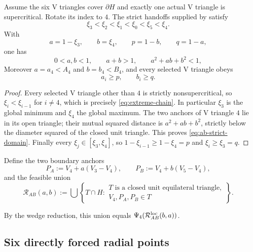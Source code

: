 \begin{lemma}
\label{lem:ab-extreme-jump}
Assume the six V triangles cover $\partial H$ and exactly one actual V triangle is
supercritical.  Rotate its index to $4$.  The strict handoffs supplied by
 satisfy
\begin{equation}
 \xi_3<\xi_2<\xi_1<\xi_0<\xi_5<\xi_4.
 \label{eq:extreme-chain}
\end{equation}
With
\begin{equation}
 a=1-\xi_3,\qquad b=\xi_4,\qquad p=1-b,\qquad q=1-a,
 \label{eq:reader-ab-parameters}
\end{equation}
one has
\begin{equation}
 0<a,b<1,\qquad a+b>1,\qquad a^2+ab+b^2<1,       \label{eq:ab-strict-domain}
\end{equation}
Moreover $a=a_4<A_4$ and $b=b_4<B_4$, and every selected V triangle obeys
\[
 a_i\ge p,\qquad b_i\ge q.
\]
\end{lemma}

\begin{proof}
Every selected V triangle other than $4$ is strictly nonsupercritical, so
$\xi_i<\xi_{i-1}$ for $i\ne4$, which is precisely
\eqref{eq:extreme-chain}.  In particular $\xi_3$ is the global minimum and
$\xi_4$ the global maximum.  The two anchors of V triangle $4$ lie in its open triangle;
their mutual squared distance is $a^2+ab+b^2$, strictly below the diameter
squared of the closed unit triangle.  This proves \eqref{eq:ab-strict-domain}.
Finally every $\xi_j\in[\xi_3,\xi_4]$, so
$1-\xi_{i-1}\ge1-\xi_4=p$ and $\xi_i\ge \xi_3=q$.
\end{proof}

Define the two boundary anchors
\[
 P_A:=V_4+a(V_3-V_4),
 \qquad
 P_B:=V_4+b(V_5-V_4),
\]
and the feasible union
\[
 \mathcal R_{AB}(a,b):=
 \bigcup\left\{T\cap H:
 \begin{array}{l}
 T\text{ is a closed unit equilateral triangle},\\
 V_4,P_A,P_B\in T
 \end{array}\right\}.
\]

By the wedge reduction, this union equals
$\Psi_4(\mathcal R_{AB}^{\rm loc}(b,a))$.

\subsection{Six directly forced radial points}

